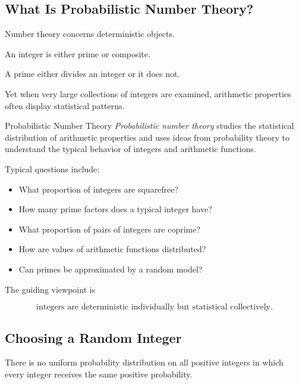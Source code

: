 \subsection{What Is Probabilistic Number Theory?}
\label{subsec:what-is-probabilistic-number-theory}

Number theory concerns deterministic objects.

An integer is either prime or composite.

A prime either divides an integer or it does not.

Yet when very large collections of integers are examined, arithmetic
properties often display statistical patterns.

\begin{definitionbox}{Probabilistic Number Theory}
\emph{Probabilistic number theory} studies the statistical distribution of
arithmetic properties and uses ideas from probability theory to understand
the typical behavior of integers and arithmetic functions.
\end{definitionbox}

Typical questions include:

\begin{itemize}
    \item What proportion of integers are squarefree?
    \item How many prime factors does a typical integer have?
    \item What proportion of pairs of integers are coprime?
    \item How are values of arithmetic functions distributed?
    \item Can primes be approximated by a random model?
\end{itemize}

The guiding viewpoint is

\[
\boxed{
\text{integers are deterministic individually but statistical collectively}.
}
\]

\subsection{Choosing a Random Integer}
\label{subsec:choosing-random-integer}

There is no uniform probability distribution on all positive integers in
which every integer receives the same positive probability.

